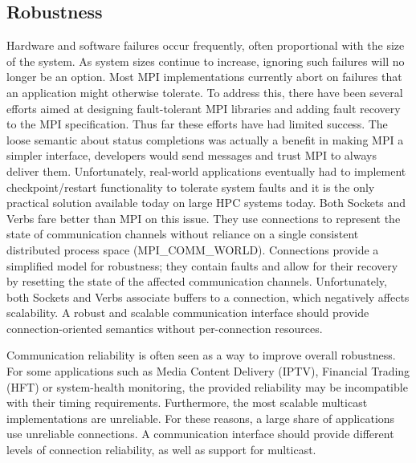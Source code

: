 \subsection{Robustness}
Hardware and software failures occur frequently, often proportional with the size of the system. 
As system sizes continue to increase, ignoring such failures will no longer be an option. 
Most MPI implementations currently abort on failures that an application might otherwise tolerate. 
To address this, there have been several efforts aimed at designing fault-tolerant MPI libraries and adding fault recovery 
to the MPI specification. Thus far these efforts have had limited success. The loose semantic about 
status completions was actually a benefit in making MPI a simpler interface, 
developers would send messages and trust MPI to always deliver them. 
Unfortunately, real-world applications eventually had to implement 
checkpoint/restart functionality to tolerate system faults and it is the 
only practical solution available today on large HPC systems today. 
Both Sockets and Verbs fare better than MPI on this issue. They use connections 
to represent the state of communication channels without reliance on a single consistent 
distributed process space ({\sf MPI\_COMM\_WORLD}). Connections provide a simplified 
model for robustness; they contain faults and allow for their recovery by resetting 
the state of the affected communication channels. 
Unfortunately, both Sockets and Verbs associate buffers to a connection, which 
negatively affects scalability. A robust and scalable communication interface should provide 
connection-oriented semantics without per-connection resources. 

Communication reliability is often seen as a way to improve overall robustness. 
For some applications such as Media Content Delivery (IPTV), Financial Trading 
(HFT) or system-health monitoring, the provided reliability may be incompatible 
with their timing requirements. 
Furthermore, the most scalable multicast implementations are unreliable. For these 
reasons, a large share of applications use unreliable connections. 
A communication interface should provide different levels of connection 
reliability, as well as support for multicast. 

